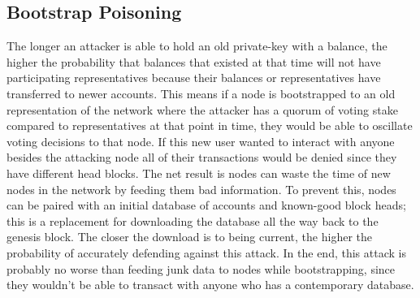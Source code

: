 \subsection{Bootstrap Poisoning}
The longer an attacker is able to hold an old private-key with a balance, the higher the probability that balances that existed at that time will not have participating representatives because their balances or representatives have transferred to newer accounts. This means if a node is bootstrapped to an old representation of the network where the attacker has a quorum of voting stake compared to representatives at that point in time, they would be able to oscillate voting decisions to that node. If this new user wanted to interact with anyone besides the attacking node all of their transactions would be denied since they have different head blocks. The net result is nodes can waste the time of new nodes in the network by feeding them bad information. To prevent this, nodes can be paired with an initial database of accounts and known-good block heads; this is a replacement for downloading the database all the way back to the genesis block. The closer the download is to being current, the higher the probability of accurately defending against this attack. In the end, this attack is probably no worse than feeding junk data to nodes while bootstrapping, since they wouldn't be able to transact with anyone who has a contemporary database.